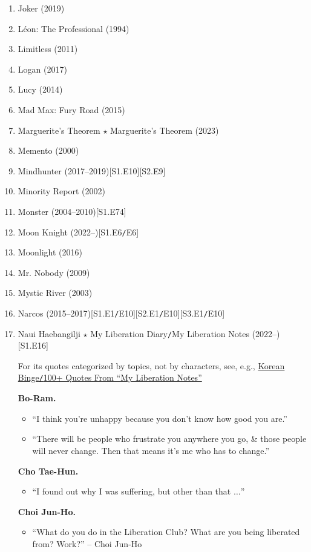 \documentclass{article}
\begin{document}
\begin{enumerate}
	\item {\sc Joker} (2019)
	\item {\sc L\'eon: The Professional} (1994)
	\item {\sc Limitless} (2011)
	\item {\sc Logan} (2017)
	\item {\sc Lucy} (2014)
	\item {\sc Mad Max: Fury Road} (2015)
	\item Marguerite's Theorem $\star$ Marguerite's Theorem (2023)
	\item {\sc Memento} (2000)
	\item {\sc Mindhunter} (2017--2019)\hfill[S1.E10][S2.E9]
	\item {\sc Minority Report} (2002)
	\item {\sc Monster} (2004--2010)\hfill[S1.E74]
	\item Moon Knight (2022--)\hfill[S1.E6{\tt/}E6]
	\item {\sc Moonlight} (2016)
	\item {\sc Mr. Nobody} (2009)
	\item {\sc Mystic River} (2003)
	\item Narcos (2015--2017)\hfill[S1.E1{\tt/}E10][S2.E1{\tt/}E10][S3.E1{\tt/}E10]
	\item Naui Haebangilji $\star$ My Liberation Diary{\tt/}My Liberation Notes (2022--)\hfill[S1.E16]
	
	For its quotes categorized by topics, not by characters, see, e.g., \href{https://korean-binge.com/2022/04/12/100-quotes-from-my-liberation-notes/}{Korean Binge{\tt/}100+ Quotes From ``My Liberation Notes''}	
	
	\textbf{Bo-Ram.}
	\begin{itemize}
		\item ``I think you're unhappy because you don't know how good you are.''
		\item ``There will be people who frustrate you anywhere you go, \& those people will never change. Then that means it's me who has to change.''
	\end{itemize}
	\textbf{Cho Tae-Hun.}
	\begin{itemize}
		\item ``I found out why I was suffering, but other than that $\ldots$''
	\end{itemize}
	\textbf{Choi Jun-Ho.}
	\begin{itemize}
		\item ``What do you do in the Liberation Club? What are you being liberated from? Work?'' -- Choi Jun-Ho
		

\end{itemize}
\end{enumerate}
\end{document}

